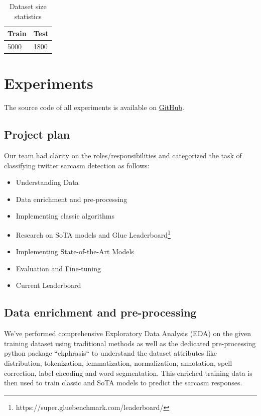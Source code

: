 \documentclass[conference]{IEEEtran}
\begin{document}
\begin{table}[htbp]
\caption{Dataset size statistics}
\begin{center}
\begin{tabular}{|l|l|}
\hline
\textbf{Train} & \textbf{Test} \\ \hline
5000 & 1800          \\ \hline
\end{tabular}
\label{tab1}
\end{center}
\end{table}

\section{Experiments}
The source code of all experiments is available on \href{https://github.com/dheerajpatta/CourseProject}{GitHub}.

\subsection{Project plan}

Our team had clarity on the roles/responsibilities and categorized the task of classifying twitter sarcasm detection as follows:

\begin{itemize}
	\item Understanding Data
	\item Data enrichment and pre-processing
	\item Implementing classic algorithms
	\item Research on SoTA models and Glue Leaderboard\footnote{https://super.gluebenchmark.com/leaderboard/}
	\item Implementing State-of-the-Art Models
	\item Evaluation and Fine-tuning
	\item Current Leaderboard
\end{itemize}

\subsection{Data enrichment and pre-processing}
We’ve performed comprehensive Exploratory Data Analysis (EDA) on the given training dataset using traditional methods as well as the dedicated pre-processing python package ``ekphrasis`` to understand the dataset attributes like distribution, tokenization, lemmatization, normalization, annotation, spell correction, label encoding and word segmentation. This enriched training data is then used to train classic and SoTA models to predict the sarcasm responses. 
\end{document}
